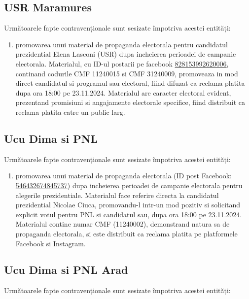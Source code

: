 \documentclass[a4paper,12pt]{article}
\begin{document}
\vspace{0.5cm}

\subsection{USR Maramures}
Următoarele fapte contravenționale sunt sesizate împotriva acestei entități:

\begin{enumerate}[leftmargin=*, label=\arabic*.)]
    \item promovarea unui material de propaganda electorala pentru candidatul prezidential Elena Lasconi (USR) dupa incheierea perioadei de campanie electorala. Materialul, cu ID-ul postarii pe facebook \href{https://www.facebook.com/ads/library/?id=828153992620006}{828153992620006}, continand codurile CMF 11240015 si CMF 31240009, promoveaza in mod direct candidatul si programul sau electoral, fiind difuzat ca reclama platita dupa ora 18:00 pe 23.11.2024. Materialul are caracter electoral evident, prezentand promisiuni si angajamente electorale specifice, fiind distribuit ca reclama platita catre un public larg.
\end{enumerate}

\vspace{0.5cm}

\subsection{Ucu Dima si PNL}
Următoarele fapte contravenționale sunt sesizate împotriva acestei entități:

\begin{enumerate}[leftmargin=*, label=\arabic*.)]
    \item promovarea unui material de propaganda electorala (ID post Facebook: \href{https://www.facebook.com/ads/library/?id=546432674845737}{546432674845737}) dupa incheierea perioadei de campanie electorala pentru alegerile prezidentiale. Materialul face referire directa la candidatul prezidential Nicolae Ciuca, promovandu-l intr-un mod pozitiv si solicitand explicit votul pentru PNL si candidatul sau, dupa ora 18:00 pe 23.11.2024. Materialul contine numar CMF (11240002), demonstrand natura sa de propaganda electorala, si este distribuit ca reclama platita pe platformele Facebook si Instagram.
\end{enumerate}

\vspace{0.5cm}

\subsection{Ucu Dima si PNL Arad}
Următoarele fapte contravenționale sunt sesizate împotriva acestei entități:
\end{document}
